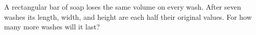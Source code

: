 A rectangular bar of soap loses the same volume on every wash. After seven washes its length, width, and height are each half their original values. For how many more washes will it last?
